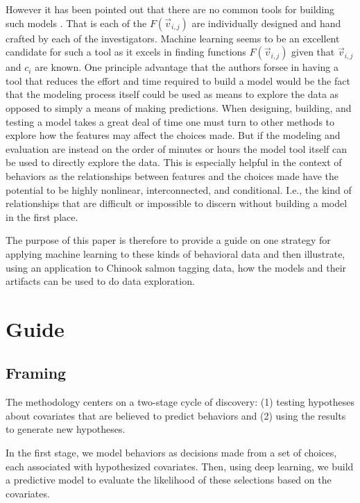 \documentclass[11pt]{article}
\begin{document}
However it has been pointed out that there are no common tools for building such models \citep{grimm}. That is each of the $F(\vec{v}_{i,j})$ are individually designed and hand crafted by each of the investigators. Machine learning seems to be an excellent candidate for such a tool as it excels in finding functions $F(\vec{v}_{i,j})$ given that $\vec{v}_{i,j}$ and $c_i$ are known. One principle advantage that the authors forsee in having a tool that reduces the effort and time required to build a model would be the fact that the modeling process itself could be used as means to explore the data as opposed to simply a means of making predictions. When designing, building, and testing a model takes a great deal of time one must turn to other methods to explore how the features may affect the choices made. But if the modeling and evaluation are instead on the order of minutes or hours the model tool itself can be used to directly explore the data. This is especially helpful in the context of behaviors as the relationships between features and the choices made have the potential to be highly nonlinear, interconnected, and conditional. I.e., the kind of relationships that are difficult or impossible to discern without building a model in the first place.

The purpose of this paper is therefore to provide a guide on one strategy for applying machine learning to these kinds of behavioral data and then illustrate, using an application to Chinook salmon tagging data, how the models and their artifacts can be used to do data exploration. 

\section*{Guide}

\subsection*{Framing}

The methodology centers on a two-stage cycle of discovery: (1) testing hypotheses about covariates that are believed to predict behaviors and (2) using the results to generate new hypotheses.

In the first stage, we model behaviors as decisions made from a set of choices, each associated with hypothesized covariates. Then, using deep learning, we build a predictive model to evaluate the likelihood of these selections based on the covariates.
\end{document}
